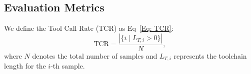 \documentclass[runningheads]{llncs}
\begin{document}
\subsection{Evaluation Metrics}\label{app: metrics}

We define the Tool Call Rate (TCR) as Eq~\ref{Eq: TCR}:
\begin{equation}\label{Eq: TCR}
 \text{TCR} = \frac{|\{i \mid L_{T,i} > 0\}|}{N},
\end{equation}
where $N$ denotes the total number of samples and $L_{T,i}$ represents the toolchain length for the $i$-th sample.



\clearpage
\end{document}
